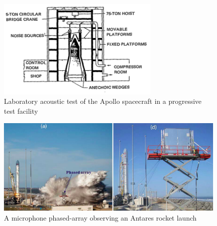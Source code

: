 \documentclass[]{aiaa-tc}%
\begin{document}
\begin{figure}[htb]
\begin{center}
\includegraphics[width=0.7\textwidth]{Images/Himelblau_Fig38.png}
\caption{Laboratory acoustic test of the Apollo spacecraft in a progressive test facility \cite{SpaceVehicleAeroacousticVibrationPrediction}}
\label{ProgressiveTest}
\end{center}
\end{figure}

\begin{figure}[htb]
\begin{center}
\includegraphics[width=1\textwidth]{Images/MicrophonePhasedArray.png}
\caption{A microphone phased-array observing an Antares rocket launch \cite{MicrophonePhasedArray}}
\label{MicrophoneArrayPic}
\end{center}
\end{figure}
\end{document}
